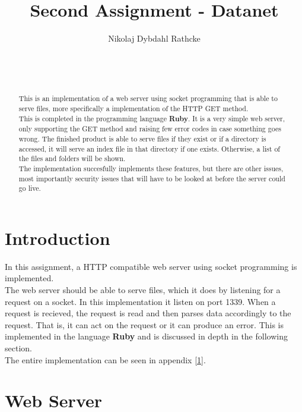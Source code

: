 \documentclass{acm_proc_article-sp}
\begin{document}
\title{Second Assignment - Datanet}

\author{
\alignauthor
Nikolaj Dybdahl Rathcke\\
       \\
       \\
       \\
}

\maketitle
\begin{abstract}
This is an implementation of a web server using socket programming that is able to serve files, more specifically a implementation of the HTTP GET method.\\
This is completed in the programming language \textbf{Ruby}. It is a very simple web server, only supporting the GET method and raising few error codes in case something goes wrong. The finished product is able to serve files if they exist or if a directory is accessed, it will serve an index file in that directory if one exists. Otherwise, a list of the files and folders will be shown.\\
The implementation succesfully implements these features, but there are other issues, most importantly security issues that will have to be looked at before the server could go live.

\end{abstract}

\section{Introduction}
In this assignment, a HTTP compatible web server using socket programming is implemented.\\
The web server should be able to serve files, which it does by listening for a request on a socket. In this implementation it listen on port 1339. When a request is recieved, the request is read and then parses data accordingly to the request. That is, it can act on the request or it can produce an error.
This is implemented in the language \textbf{Ruby} and is discussed in depth in the following section.\\
The entire implementation can be seen in appendix \ref{1}.

\section{Web Server}
\end{document}
